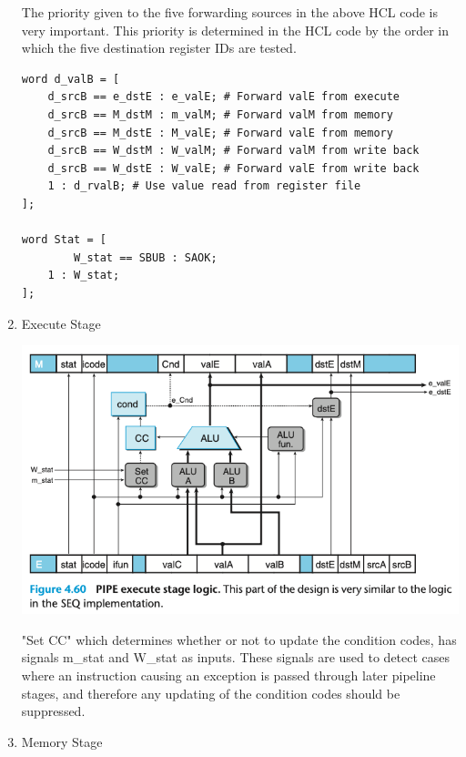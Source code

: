 \documentclass[11pt]{article}
\begin{document}
\begin{enumerate}
The priority given to the five forwarding sources in the above HCL code is very important. This priority is determined in the HCL code by the order in which the five destination register IDs are tested.\\

\begin{verbatim}
word d_valB = [
 	d_srcB == e_dstE : e_valE; # Forward valE from execute
	d_srcB == M_dstM : m_valM; # Forward valM from memory
	d_srcB == M_dstE : M_valE; # Forward valE from memory
	d_srcB == W_dstM : W_valM; # Forward valM from write back
	d_srcB == W_dstE : W_valE; # Forward valE from write back
	1 : d_rvalB; # Use value read from register file
];

word Stat = [
        W_stat == SBUB : SAOK;
	1 : W_stat;
];
\end{verbatim}


\item Execute Stage
\label{sec:org751996f}

\begin{center}
\includegraphics[width=.9\linewidth]{pics/figure4.60-pipe-execute-stage-logic.png}
\end{center}

"Set CC"  which determines whether or not to update the condition codes, has signals m\_stat and W\_stat as inputs. These signals are used to detect cases where an instruction causing an exception is passed through later pipeline stages, and therefore any updating of the condition codes should be suppressed.\\

\item Memory Stage
\label{sec:orgeb42faa}


\end{enumerate}
\end{document}
